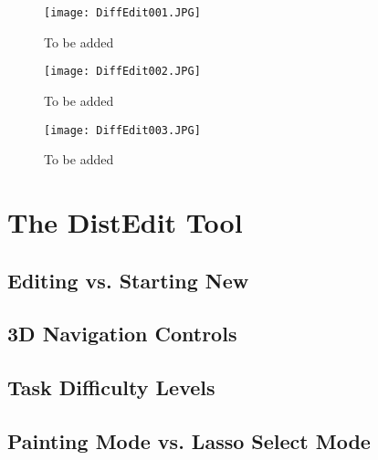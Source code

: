 \begin{figure}
\centering
\texttt{[image: DiffEdit001.JPG]}
\caption{To be added}
\label{DiffEdit001}
\end{figure}

\begin{figure}
\centering
\texttt{[image: DiffEdit002.JPG]}
\caption{To be added}
\label{DiffEdit002}
\end{figure}

\begin{figure}
\centering
\texttt{[image: DiffEdit003.JPG]}
\caption{To be added}
\label{DiffEdit003}
\end{figure}


\section{The DistEdit Tool}
\label{DistEdit}


\subsection{Editing vs. Starting New}


\subsection{3D Navigation Controls}


\subsection{Task Difficulty Levels}


\subsection{Painting Mode vs. Lasso Select Mode}










